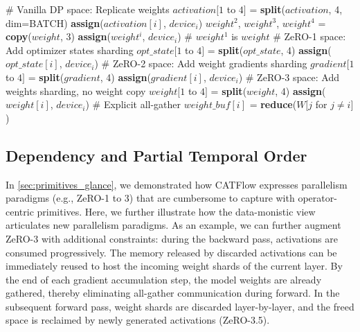 \documentclass[letterpaper,twocolumn,10pt]{article}
\newcommand{\name}{CATFlow}
\begin{document}
\begin{algorithm}[h]
\caption{Primitive program for vanilla DP and ZeRO-1 to 3. Assume the number of devices is 4.}
\label{alg:fsdp}
\begin{algorithmic}[1]
\STATE \# Vanilla DP space: Replicate weights
\STATE $activation[1$ to $4]$ = \textbf{split}($activation$, 4, dim=BATCH)
\STATE \textbf{assign}($activation[i]$, $device_i$)
\STATE $weight^2$, $weight^3$, $weight^4$ = \textbf{copy}($weight$, 3)
\STATE \textbf{assign}($weight^i$, $device_i$) \# $weight^1$ is $weight$
\STATE \# ZeRO-1 space: Add optimizer states sharding
\STATE $opt\_state[1$ to $4]$ = \textbf{split}($opt\_state$, 4)
\STATE \textbf{assign}($opt\_state[i]$, $device_i$)
\STATE \# ZeRO-2 space: Add weight gradients sharding
\STATE $gradient[1$ to $4]$ = \textbf{split}($gradient$, 4)
\STATE \textbf{assign}($gradient[i]$, $device_i$)
\STATE \# ZeRO-3 space: Add weights sharding, no weight copy
\STATE $weight[1$ to $4]$ = \textbf{split}($weight$, 4)
\STATE \textbf{assign}($weight[i]$, $device_i$) 
\STATE \# Explicit all-gather
\STATE $weight\_buf[i]$ = \textbf{reduce}($W[j$ for $j \neq i]$)
\end{algorithmic}
\end{algorithm}



\vspace{-1em}
\subsection{Dependency and Partial Temporal Order}
\label{sec:dependency}

In \cref{sec:primitives_glance}, we demonstrated how \name{} expresses parallelism paradigms (e.g., ZeRO-1 to 3) that are cumbersome to capture with operator-centric primitives. Here, we further illustrate how the data-monistic view articulates new parallelism paradigms. As an example, we can further augment ZeRO-3 with additional constraints: during the backward pass, activations are consumed progressively. The memory released by discarded activations can be immediately reused to host the incoming weight shards of the current layer. By the end of each gradient accumulation step, the model weights are already gathered, thereby eliminating all-gather communication during forward. In the subsequent forward pass, weight shards are discarded layer-by-layer, and the freed space is reclaimed by newly generated activations (ZeRO-3.5).
\end{document}
